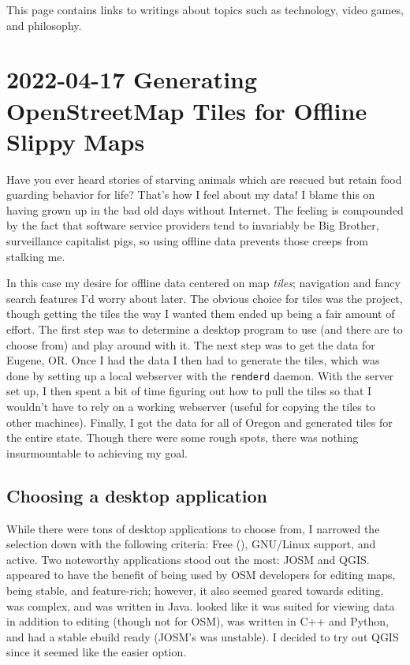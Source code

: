 \documentclass{article}
\begin{document}
This page contains links to writings about topics such as technology, video games, and philosophy.

\tableofchildlinks*

\section{2022-04-17 Generating OpenStreetMap Tiles for Offline Slippy Maps}
Have you ever heard stories of starving animals which are rescued but retain food guarding behavior for life?  That's how I feel about my data!  I blame this on having grown up in the bad old days without Internet.  The feeling is compounded by the fact that software service providers tend to invariably be Big Brother, surveillance capitalist pigs, so using offline data prevents those creeps from stalking me.

In this case my desire for offline data centered on map \emph{tiles}; navigation and fancy search features I'd worry about later.  The obvious choice for tiles was the  project, though getting the tiles the way I wanted them ended up being a fair amount of effort.  The first step was to determine a desktop program to use (and there are  to choose from) and play around with it.  The next step was to get the data for Eugene, OR.  Once I had the data I then had to generate the tiles, which was done by setting up a local webserver with the \texttt{renderd} daemon.  With the server set up, I then spent a bit of time figuring out how to pull the tiles so that I wouldn't have to rely on a working webserver (useful for copying the tiles to other machines).  Finally, I got the data for all of Oregon and generated tiles for the entire state.  Though there were some rough spots, there was nothing insurmountable to achieving my goal.

\subsection{Choosing a desktop application}
While there were tons of desktop applications to choose from, I narrowed the selection down with the following criteria: Free (), GNU/Linux support, and active.  Two noteworthy applications stood out the most: JOSM and QGIS.   appeared to have the benefit of being used by OSM developers for editing maps, being stable, and feature-rich; however, it also seemed geared towards editing, was complex, and was written in Java.   looked like it was suited for viewing data in addition to editing (though not for OSM), was written in C++ and Python, and had a stable ebuild ready (JOSM's was unstable).  I decided to try out QGIS since it seemed like the easier option.
\end{document}
